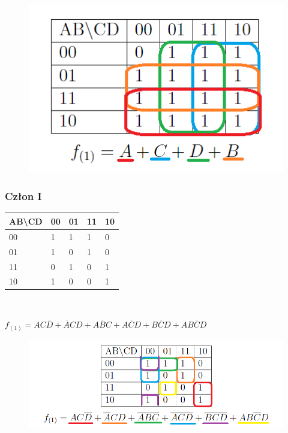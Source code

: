 \documentclass[a4paper]{article}
\begin{document}
\begin{figure}[H]
 \centering
 \includegraphics{tab_J.png}
\end{figure}


\subsubsection{Człon I}
\begin{center}
\begin{tabular}{|l|l|l|l|l|}
  \hline
  AB\textbackslash{}CD & 00 & 01 & 11 & 10 \\ \hline
  00                   & 1  & 1  & 1  & 0  \\ \hline
  01                   & 1  & 0  & 1  & 0  \\ \hline
  11                   & 0  & 1  & 0  & 1  \\ \hline
  10                   & 1  & 0  & 0  & 1  \\ \hline
  \end{tabular}  \\
\end{center}
\begin{center}
  $f_{(1)} = AC\overline{D} + \overline{A}CD+\overline{ABC}+\overline{ACD}+\overline{BCD}+AB\overline{C}D $
\end{center}

\begin{figure}[H]
  \centering
  \includegraphics{tab_I.png}
 \end{figure}
\end{document}
